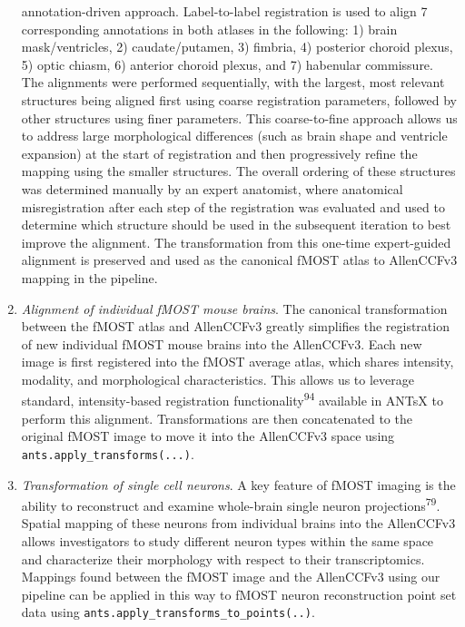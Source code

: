 \documentclass[
  12pt,
]{article}
\begin{document}
\begin{enumerate}
  annotation-driven approach. Label-to-label registration is used to
  align 7 corresponding annotations in both atlases in the following: 1)
  brain mask/ventricles, 2) caudate/putamen, 3) fimbria, 4) posterior
  choroid plexus, 5) optic chiasm, 6) anterior choroid plexus, and 7)
  habenular commissure. The alignments were performed sequentially, with
  the largest, most relevant structures being aligned first using coarse
  registration parameters, followed by other structures using finer
  parameters. This coarse-to-fine approach allows us to address large
  morphological differences (such as brain shape and ventricle
  expansion) at the start of registration and then progressively refine
  the mapping using the smaller structures. The overall ordering of
  these structures was determined manually by an expert anatomist, where
  anatomical misregistration after each step of the registration was
  evaluated and used to determine which structure should be used in the
  subsequent iteration to best improve the alignment. The transformation
  from this one-time expert-guided alignment is preserved and used as
  the canonical fMOST atlas to AllenCCFv3 mapping in the pipeline.
\item
  \emph{Alignment of individual fMOST mouse brains}. The canonical
  transformation between the fMOST atlas and AllenCCFv3 greatly
  simplifies the registration of new individual fMOST mouse brains into
  the AllenCCFv3. Each new image is first registered into the fMOST
  average atlas, which shares intensity, modality, and morphological
  characteristics. This allows us to leverage standard, intensity-based
  registration functionality\textsuperscript{94} available in ANTsX to
  perform this alignment. Transformations are then concatenated to the
  original fMOST image to move it into the AllenCCFv3 space using
  \texttt{ants.apply\_transforms(...)}.
\item
  \emph{Transformation of single cell neurons}. A key feature of fMOST
  imaging is the ability to reconstruct and examine whole-brain single
  neuron projections\textsuperscript{79}. Spatial mapping of these
  neurons from individual brains into the AllenCCFv3 allows
  investigators to study different neuron types within the same space
  and characterize their morphology with respect to their
  transcriptomics. Mappings found between the fMOST image and the
  AllenCCFv3 using our pipeline can be applied in this way to fMOST
  neuron reconstruction point set data using
  \texttt{ants.apply\_transforms\_to\_points(..)}.
\end{enumerate}
\end{document}

